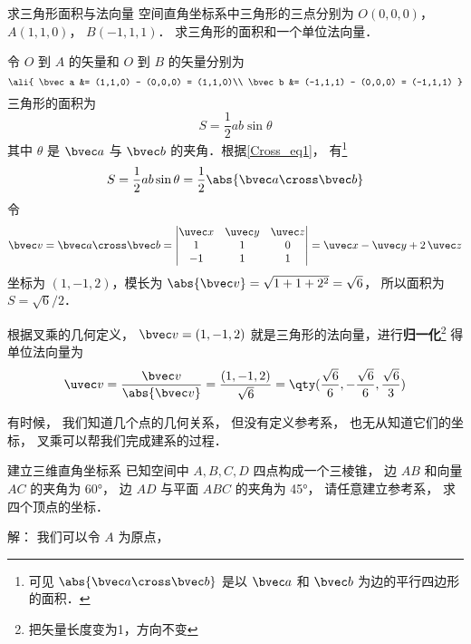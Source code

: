 \begin{example}{求三角形面积与法向量}\label{Cross_exe1}
空间直角坐标系中三角形的三点分别为 $O(0,0,0)$，  $A(1,1,0)$，  $B(-1,1,1)$． 求三角形的面积和一个单位法向量．

令 $O$ 到 $A$ 的矢量和  $O$ 到 $B$ 的矢量分别为
\begin{equation}
\ali{
\bvec a  &= (1,1,0) - (0,0,0) = (1,1,0)\\
\bvec b  &= (-1,1,1) - (0,0,0) = (-1,1,1)
}\end{equation}
三角形的面积为
 \begin{equation}
S = \frac12 ab \sin \theta 
\end{equation}
其中 $\theta $ 是 $\bvec a$ 与 $\bvec b$ 的夹角．根据\autoref{Cross_eq1}， 有\footnote{可见 $\abs{\bvec a\cross\bvec b}$ 是以 $\bvec a$ 和 $\bvec b$ 为边的平行四边形的面积．}
\begin{equation}
S = \frac12 ab \sin \theta  = \frac12 \abs{\bvec a\cross\bvec b}
\end{equation}
令
\begin{equation}
\bvec v = \bvec a \cross \bvec b = 
\begin{vmatrix} \uvec x & \uvec y & \uvec z \\ 1&1&0\\-1&1&1 \end{vmatrix}
= \uvec x - \uvec y + 2\,\uvec z 
\end{equation}
坐标为 $(1,-1,2)$，模长为 $\abs{\bvec v} = \sqrt{1 + 1 + 2^2} = \sqrt 6$， 所以面积为 $S = \sqrt 6 /2$． 

根据叉乘的几何定义， $\bvec v = (1,-1,2)$ 就是三角形的法向量，进行\textbf{归一化}\footnote{把矢量长度变为1，方向不变}
得单位法向量为
 \begin{equation}
\uvec v = \frac{\bvec v}{\abs{\bvec v}} = \frac{(1,-1,2)}{\sqrt 6} = \qty( \frac{\sqrt 6 }{6}, - \frac{\sqrt 6 }{6}, \frac{\sqrt 6 }{3} )
\end{equation}
\end{example}

有时候， 我们知道几个点的几何关系， 但没有定义参考系， 也无从知道它们的坐标， 叉乘可以帮我们完成建系的过程．
\begin{example}{建立三维直角坐标系}
已知空间中 $A, B, C, D$ 四点构成一个三棱锥， 边 $AB$ 和向量 $AC$ 的夹角为 60°， 边 $AD$ 与平面 $ABC$ 的夹角为 45°， 请任意建立参考系， 求四个顶点的坐标．

解： 我们可以令 $A$ 为原点， 
\end{example}
